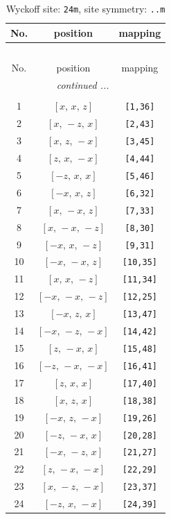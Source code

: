 \documentclass[fleqn,8pt]{jsarticle}
\begin{document}
\begin{longtable}{ccc}
\caption{Wyckoff site: {\tt 24m}, site symmetry: {\tt ..m}}
 \\
 \hline \hline
No. & position & mapping \\ \hline \endfirsthead

\multicolumn{2}{l}{\tablename\ \thetable{}} \\
 \hline \hline
No. & position & mapping \\ \hline \endhead

 \hline \hline
\multicolumn{2}{r}{\footnotesize\it continued ...} \\ \endfoot

 \hline \hline
\multicolumn{2}{r}{} \\ \endlastfoot

1 & $\left[ x,\, x,\, z \right]$ & {\tt [1,36]} \\ \hline
2 & $\left[ x,\, - z,\, x \right]$ & {\tt [2,43]} \\ \hline
3 & $\left[ x,\, z,\, - x \right]$ & {\tt [3,45]} \\ \hline
4 & $\left[ z,\, x,\, - x \right]$ & {\tt [4,44]} \\ \hline
5 & $\left[ - z,\, x,\, x \right]$ & {\tt [5,46]} \\ \hline
6 & $\left[ - x,\, x,\, z \right]$ & {\tt [6,32]} \\ \hline
7 & $\left[ x,\, - x,\, z \right]$ & {\tt [7,33]} \\ \hline
8 & $\left[ x,\, - x,\, - z \right]$ & {\tt [8,30]} \\ \hline
9 & $\left[ - x,\, x,\, - z \right]$ & {\tt [9,31]} \\ \hline
10 & $\left[ - x,\, - x,\, z \right]$ & {\tt [10,35]} \\ \hline
11 & $\left[ x,\, x,\, - z \right]$ & {\tt [11,34]} \\ \hline
12 & $\left[ - x,\, - x,\, - z \right]$ & {\tt [12,25]} \\ \hline
13 & $\left[ - x,\, z,\, x \right]$ & {\tt [13,47]} \\ \hline
14 & $\left[ - x,\, - z,\, - x \right]$ & {\tt [14,42]} \\ \hline
15 & $\left[ z,\, - x,\, x \right]$ & {\tt [15,48]} \\ \hline
16 & $\left[ - z,\, - x,\, - x \right]$ & {\tt [16,41]} \\ \hline
17 & $\left[ z,\, x,\, x \right]$ & {\tt [17,40]} \\ \hline
18 & $\left[ x,\, z,\, x \right]$ & {\tt [18,38]} \\ \hline
19 & $\left[ - x,\, z,\, - x \right]$ & {\tt [19,26]} \\ \hline
20 & $\left[ - z,\, - x,\, x \right]$ & {\tt [20,28]} \\ \hline
21 & $\left[ - x,\, - z,\, x \right]$ & {\tt [21,27]} \\ \hline
22 & $\left[ z,\, - x,\, - x \right]$ & {\tt [22,29]} \\ \hline
23 & $\left[ x,\, - z,\, - x \right]$ & {\tt [23,37]} \\ \hline
24 & $\left[ - z,\, x,\, - x \right]$ & {\tt [24,39]} \\
\end{longtable}
\end{document}
